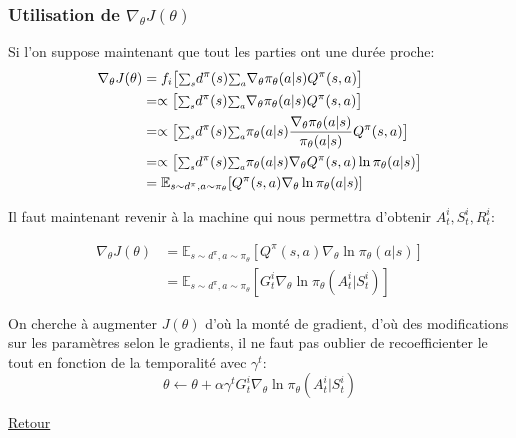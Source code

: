 \documentclass[8pt]{beamer}
\begin{document}
\begin{frame}
  \frametitle{Utilisation de $\nabla_\theta J(\theta)$}
  Si l'on suppose maintenant que tout les parties ont une durée proche:
  \begin{align*}
    \nabla_\theta J(\theta) &= f_i\big[{\scalebox{0.85}{$\sum_{s}$}}d^{\pi}(s) {\scalebox{0.85}{$\sum_{a}$}} \nabla_{\theta}\pi_{\theta}(a|s)Q^{\pi}(s,a)\big] \\
    &= \propto \big[{\scalebox{0.85}{$\sum_{s}$}}d^{\pi}(s) {\scalebox{0.85}{$\sum_{a}$}} \nabla_{\theta}\pi_{\theta}(a|s)Q^{\pi}(s,a)\big] \\
    &= \propto \big[{\scalebox{0.85}{$\sum_{s}$}}d^{\pi}(s) {\scalebox{0.85}{$\sum_{a}$}} \pi_{\theta}(a|s) \frac{\nabla_{\theta}\pi_{\theta}(a|s)}{\pi_{\theta}(a|s)}Q^{\pi}(s,a)\big] \\
    &= \propto \big[{\scalebox{0.85}{$\sum_{s}$}}d^{\pi}(s) {\scalebox{0.85}{$\sum_{a}$}} \pi_{\theta}(a|s) \nabla_{\theta}Q^{\pi}(s,a)\ln \pi_{\theta}(a|s) \big] \\
    &= \mathbb{E}_{s \sim d^{\pi},a \sim\pi_{\theta}} [Q^{\pi}(s,a)\nabla_{\theta} \ln \pi_{\theta}(a|s)]
  \end{align*}

  Il faut maintenant revenir à la machine qui nous permettra d'obtenir $A_t^i, S_t^i, R_t^i$:

  \begin{align*}
    \nabla_\theta J(\theta) &= \mathbb{E}_{s \sim d^{\pi},a \sim\pi_{\theta}} [Q^{\pi}(s,a)\nabla_{\theta} \ln \pi_{\theta}(a|s)] \\
    &= \mathbb{E}_{s \sim d^{\pi},a \sim\pi_{\theta}} [G_t^i \nabla_{\theta} \ln \pi_{\theta}(A^i_t|S^i_t)]
  \end{align*}

  On cherche à augmenter $J(\theta)$ d'où la monté de gradient, d'où des modifications sur les paramètres selon le gradients, il ne faut pas oublier de recoefficienter le tout en fonction de la temporalité avec $\gamma^t$:
  \[ \theta \leftarrow \theta + \alpha \gamma^t G^i_t \nabla_\theta \ln \pi_\theta(A^i_t \vert S^i_t) \]

  \hyperlink{policyintroduction}{Retour}
\end{frame}
\end{document}
